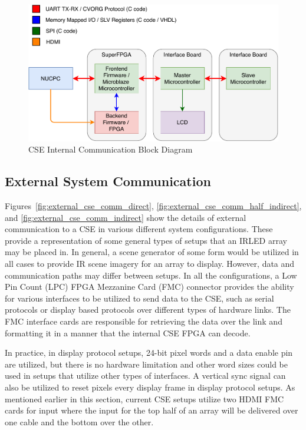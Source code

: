         \begin{figure}
            \centering
            \includegraphics[width=1.0\textwidth]{fig/cse_comm_block.pdf}
            \caption{CSE Internal Communication Block Diagram}
            \label{fig:cse_comm_block}
        \end{figure}

    \subsection{External System Communication}
         Figures~\ref{fig:external_cse_comm_direct}, \ref{fig:external_cse_comm_half_indirect}, and \ref{fig:external_cse_comm_indirect} show the details of external communication to a CSE in various different system configurations. These provide a representation of some general types of setups that an IRLED array may be placed in. In general, a scene generator of some form would be utilized in all cases to provide IR scene imagery for an array to display. However, data and communication paths may differ between setups. In all the configurations, a Low Pin Count (LPC) FPGA Mezzanine Card (FMC) connector provides the ability for various interfaces to be utilized to send data to the CSE, such as serial protocols or display based protocols over different types of hardware links. The FMC interface cards are responsible for retrieving the data over the link and formatting it in a manner that the internal CSE FPGA can decode.

        In practice, in display protocol setups, 24-bit pixel words and a data enable pin are utilized, but there is no hardware limitation and other word sizes could be used in setups that utilize other types of interfaces. A vertical sync signal can also be utilized to reset pixels every display frame in display protocol setups. As mentioned earlier in this section, current CSE setups utilize two HDMI FMC cards for input where the input for the top half of an array will be delivered over one cable and the bottom over the other.

